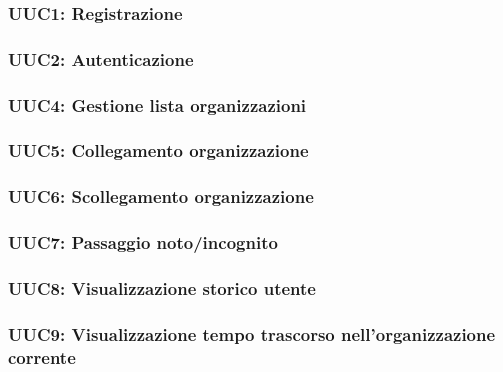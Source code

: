\documentclass[../analisi-dei-requisiti.tex]{subfiles}
\begin{document}
\subsubsection{UUC1: Registrazione}%
\label{subs:UUC1}



\subsubsection{UUC2: Autenticazione}%
\label{subs:UUC2}



\subsubsection{UUC4: Gestione lista organizzazioni}%
\label{subs:UUC4}



\subsubsection{UUC5: Collegamento organizzazione}%
\label{subs:UUC5}



\subsubsection{UUC6: Scollegamento organizzazione}%
\label{subs:UUC6}



\subsubsection{UUC7: Passaggio noto/incognito}%
\label{subs:UUC7}



\subsubsection{UUC8: Visualizzazione storico utente}%
\label{subs:UUC8}



\subsubsection{UUC9: Visualizzazione tempo trascorso nell'organizzazione corrente}%
\label{subs:UUC9}
\end{document}

